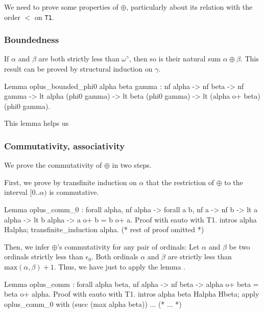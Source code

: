 We need to prove some properties of $\oplus$, particularly about 
its relation with the order $<$ on \texttt{T1}.

\subsubsection{Boundedness}
If $\alpha$ and $\beta$ are both strictly  less than  $\omega^\gamma$, then so is their natural sum
$\alpha \oplus \beta$. This result can be proved by structural induction on $\gamma$.


\begin{Coqsrc}
Lemma oplus_bounded_phi0 alpha beta gamma :
  nf alpha -> nf beta -> nf gamma ->
  lt alpha (phi0 gamma) ->
  lt beta (phi0 gamma) ->
  lt (alpha o+ beta) (phi0 gamma).
\end{Coqsrc}

This lemma helps us 

\subsubsection{Commutativity, associativity}

We prove  the commutativity of $\oplus$ in two steps. 

First, we prove by transfinite induction on $\alpha$ that the restriction of $\oplus$ to the
interval $[0..\alpha)$ is commutative.


\begin{Coqsrc}
Lemma oplus_comm_0 : forall alpha, nf alpha ->
     forall a b,  nf a -> nf b ->
                  lt a alpha ->
                  lt b alpha ->
                  a o+ b = b o+ a.
 Proof with eauto with T1.
    intros alpha Halpha; transfinite_induction alpha.
(* rest of proof omitted *)  
\end{Coqsrc}

Then, we infer  $\oplus$'s commutativity for any pair of ordinals:
Let $\alpha$ and $\beta$ be two ordinals strictly less than $\epsilon_0$. Both ordinals $\alpha$ and $\beta$ are
strictly less than $\textrm{max}(\alpha,\beta)+1$.
    Thus, we have just to apply the lemma .

\begin{Coqsrc}
  Lemma oplus_comm : forall alpha beta, 
      nf alpha -> nf beta ->
      alpha o+ beta =  beta o+ alpha.
  Proof with eauto with T1.
    intros alpha beta Halpha Hbeta;
    apply oplus_comm_0 with (succ (max alpha beta)) ...  
  (* ... *)
\end{Coqsrc}

